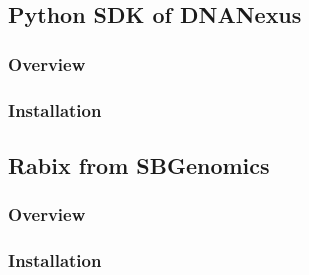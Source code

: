 \documentclass[UTF8]{beamer}
\begin{document}
\subsection{Python SDK of DNANexus}

\begin{frame}
  \frametitle{Overview}
\end{frame}

\begin{frame}
  \frametitle{Installation}
\end{frame}

\subsection{Rabix from SBGenomics}

\begin{frame}
  \frametitle{Overview}
\end{frame}

\begin{frame}
  \frametitle{Installation}
\end{frame}
\end{document}
